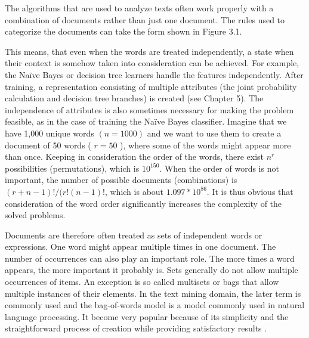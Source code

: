 \documentclass[11pt,openany,executivepaper]{book}
\begin{document}
The algorithms that are used to analyze texts often work properly with a combination of documents rather than just one document. The rules used to categorize the documents can take the form shown in Figure 3.1.

This means, that even when the words are treated independently, a state when their context is somehow taken into consideration can be achieved. For example, the Naïve Bayes or decision tree learners handle the features independently. After training, a representation consisting of multiple attributes (the joint probability calculation and decision tree branches) is created (see Chapter 5). The independence of attributes is also sometimes necessary for making the problem feasible, as in the case of training the Naïve Bayes classifier. Imagine that we have 1,000 unique words $(n=1000)$ and we want to use them to create a document of 50 words ( $r=50$ ), where some of the words might appear more than once. Keeping in consideration the order of the words, there exist $n^{r}$ possibilities (permutations), which is $10^{150}$. When the order of words is not important, the number of possible documents (combinations) is $(r+n-1)!/(r!(n-1)!$, which is about $1.097 * 10^{86}$. It is thus obvious that consideration of the word order significantly increases the complexity of the solved problems.

Documents are therefore often treated as sets of independent words or expressions. One word might appear multiple times in one document. The number of occurrences can also play an important role. The more times a word appears, the more important it probably is. Sets generally do not allow multiple occurrences of items. An exception is so called multisets or bags that allow multiple instances of their elements. In the text mining domain, the later term is commonly used and the bag-of-words model is a model commonly used in natural language processing. It become very popular because of its simplicity and the straightforward process of creation while providing satisfactory results \cite{135}.
\end{document}

